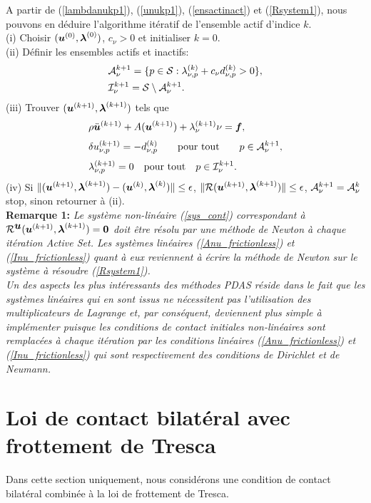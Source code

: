A partir de (\ref{lambdanukp1}), (\ref{unukp1}), (\ref{ensactinact}) et (\ref{Rsystem1}), nous pouvons en déduire l'algorithme itératif de l'ensemble actif d'indice $k$.\\
\qquad(i) Choisir $(\mbox{\boldmath{$u$}}^{(0)},\mbox{\boldmath{$\lambda$}}^{(0)})$, $c_{\nu}>0$ et initialiser $k=0$.\\[3mm]
\qquad(ii) Définir les ensembles actifs et inactifs:
\begin{align*}
&{\cal A}_{\nu}^{k+1}=\{p\in {\cal S}:\lambda^{(k)}_{\nu,p}+c_{\nu} d^{(k)}_{\nu,p}> 0\},\\
&{\cal I}_{\nu}^{k+1}={\cal S}\setminus {\cal A}_{\nu}^{k+1}.
\end{align*}
(iii) Trouver $(\mbox{\boldmath{$u$}}^{(k+1) },\mbox{\boldmath{$\lambda$}}^{(k+1) })$ tels que
\begin{eqnarray}
&\label{sys_cont}\rho \ddot{\bu}^{(k+1)} + A(\bu^{(k+1)}) + \lambda_{\nu}^{(k+1)}\nu = \fb, \\[1mm]
&\label{Anu_frictionless}\delta u^{(k+1)}_{\nu,p} = -d^{(k)}_{\nu,p} \qquad {\rm pour \ tout} \qquad p\in {\cal A}_{\nu}^{k+1},\\[1mm]
&\label{Inu_frictionless}\lambda^{(k+1)}_{\nu,p}=0 \quad {\rm pour \ tout} \quad p\in {\cal I}_{\nu}^{k+1}.
\end{eqnarray}
(iv) Si $\|(\mbox{\boldmath{$u$}}^{(k+1) },\mbox{\boldmath{$\lambda$}}^{(k+1)})-(\mbox{\boldmath{$u$}}^{(k) },\mbox{\boldmath{$\lambda$}}^{(k)})\|\leq\epsilon$, $\|{\cal R}(\mbox{\boldmath{$u$}}^{(k+1) },\mbox{\boldmath{$\lambda$}}^{(k+1)})\|\leq\epsilon$, ${\cal A}_{\nu}^{k+1}={\cal A}_{\nu}^{k}$  stop, sinon retourner à (ii).\\[1mm]
{\bf Remarque 1:} \textit{Le système non-linéaire (\ref{sys_cont}) correspondant à ${\cal R}^{\mbox{\boldmath{$u$}}}(\mbox{\boldmath{$u$}}^{(k+1)},\mbox{\boldmath{$\lambda$}}^{(k+1)})=\mbox{\boldmath{$0$}}$ doit être résolu par une méthode de Newton à chaque itération Active Set. Les systèmes linéaires (\ref{Anu_frictionless}) et (\ref{Inu_frictionless}) quant à eux reviennent à écrire la méthode de Newton sur le système à résoudre (\ref{Rsystem1}).}\\

 \textit{Un des aspects les plus intéressants des méthodes PDAS réside dans le fait que les systèmes linéaires qui en sont issus ne nécessitent pas l'utilisation des multiplicateurs de Lagrange et, par conséquent, deviennent plus simple à implémenter puisque les conditions de contact initiales non-linéaires sont remplacées à chaque itération par les conditions linéaires (\ref{Anu_frictionless}) et (\ref{Inu_frictionless}) qui sont respectivement des conditions de Dirichlet et de Neumann.}

\section{Loi de contact bilatéral avec frottement de Tresca}
\label{trescaactive}
Dans cette section uniquement, nous considérons une condition de contact bilatéral combinée à la loi de frottement de Tresca.

